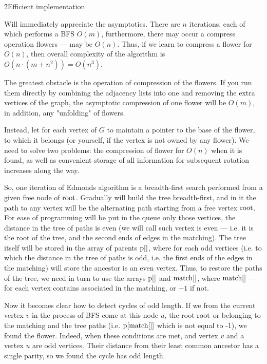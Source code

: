 \h2{Efficient implementation}

Will immediately appreciate the asymptotics. There are $n$ iterations, each of which performs a BFS $O(m)$, furthermore, there may occur a compress operation flowers --- may be $O(n)$. Thus, if we learn to compress a flower for $O(n)$, then overall complexity of the algorithm is $O(n \cdot (m + n^2)) = O(n^3)$.

The greatest obstacle is the operation of compression of the flowers. If you run them directly by combining the adjacency lists into one and removing the extra vertices of the graph, the asymptotic compression of one flower will be $O(m)$, in addition, any "unfolding" of flowers.

Instead, let for each vertex of $G$ to maintain a pointer to the base of the flower, to which it belongs (or yourself, if the vertex is not owned by any flower). We need to solve two problems: the compression of flower for $O(n)$ when it is found, as well as convenient storage of all information for subsequent rotation increases along the way.

So, one iteration of Edmonds algorithm is a breadth-first search performed from a given free node of $\rm root$. Gradually will build the tree breadth-first, and in it the path to any vertex will be the alternating path starting from a free vertex $\rm root$. For ease of programming will be put in the queue only those vertices, the distance in the tree of paths is even (we will call such vertex is even --- i.e. it is the root of the tree, and the second ends of edges in the matching). The tree itself will be stored in the array of parents $\rm p[]$, where for each odd vertices (i.e. to which the distance in the tree of paths is odd, i.e. the first ends of the edges in the matching) will store the ancestor is an even vertex. Thus, to restore the paths of the tree, we need in turn to use the arrays $\rm p[]$ and $\rm match[]$, where $\rm match[]$ --- for each vertex contains associated in the matching, or $-1$ if not.

Now it becomes clear how to detect cycles of odd length. If we from the current vertex $v$ in the process of BFS come at this node $u$, the root $\rm root$ or belonging to the matching and the tree paths (i.e. $\rm p[match[]]$ which is not equal to -1), we found the flower. Indeed, when these conditions are met, and vertex $v$ and a vertex $u$ are odd vertices. Their distance from their least common ancestor has a single parity, so we found the cycle has odd length.

